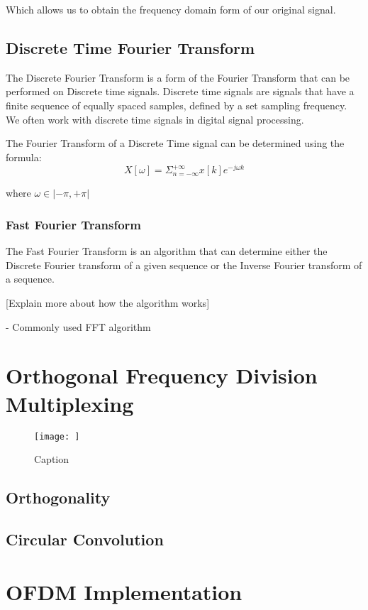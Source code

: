 \documentclass{article}
\begin{document}
Which allows us to obtain the frequency domain form of our original signal.

\subsection{Discrete Time Fourier Transform}
The Discrete Fourier Transform is a form of the Fourier Transform that can be performed on Discrete time signals. Discrete time signals are signals that have a finite sequence of equally spaced samples, defined by a set sampling frequency. We often work with discrete time signals in digital signal processing. 

The Fourier Transform of a Discrete Time signal can be determined using the formula:
\begin{equation}
    X[\omega] = \Sigma_{n=-\infty}^{+\infty} x[k]e^{-j \omega k}
\end{equation}

where $\omega \in |-\pi,+\pi|$
\subsubsection{Fast Fourier Transform}
The Fast Fourier Transform is an algorithm that can determine either the Discrete Fourier transform of a given sequence or the Inverse Fourier transform of a sequence.

[Explain more about how the algorithm works]

- Commonly used FFT algorithm


\section{Orthogonal Frequency Division Multiplexing}


\begin{figure}
    \centering
    \texttt{[image: ]}
    \caption{Caption}
    \label{fig:OFDM_Block_Diagram}
\end{figure}

\subsection{Orthogonality}

\subsection{Circular Convolution}


\section{OFDM Implementation}




\printbibliography
\end{document}
